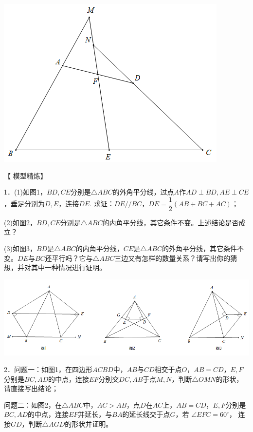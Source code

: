 \documentclass[10pt]{ctexart}
\begin{document}
\begin{center}
	\includegraphics[scale=0.6]{figure/zhongdian12}
\end{center}

【 {\heiti 模型精炼}】

\begin{shaded}
1．(1)如图1，$BD,CE$分别是$\triangle ABC$的外角平分线，过点$A$作$AD\perp BD,
AE\perp CE$，垂足分别为$D,E$，连接$DE$.
求证：$DE//BC$，$DE=\dfrac{1}{2}(AB+BC+AC)$；

(2)如图2，$BD,CE$分别是$\triangle ABC$的内角平分线，其它条件不变。上述结论是否成立？ 

(3)如图3，$BD$是$\triangle ABC$的内角平分线，$CE$是$\triangle ABC$的外角平分线，其它条件不变。$DE$与$BC$还平行吗？它与$\triangle ABC$三边又有怎样的数量关系？请写出你的猜想，并对其中一种情况进行证明。 
\end{shaded}

\begin{center}
	\includegraphics[scale=0.6]{figure/zhongdian13}
\end{center}

\begin{shaded}
2．问题一：如图1，在四边形$ACBD$中，$AB$与$CD$相交于点$O$，$AB=CD$，$E,F$分别是$BC,AD$的中点，连接$EF$分别交$DC,AB$于点$M,N$，判断$\triangle OMN$的形状，请直接写出结论；

问题二：如图2，在$\triangle ABC$中，$AC>AB$，点$D$在$AC$上，$AB=CD$，$E,F$分别是$BC,
AD$的中点，连接$EF$并延长，与$BA$的延长线交于点$G$，若 $\angle EFC=60^\circ$，
连接$GD$，判断$\triangle AGD$的形状并证明。
\end{shaded}
\end{document}
